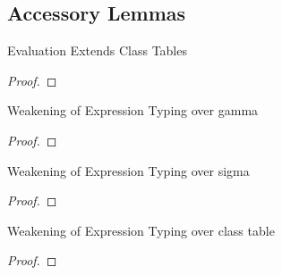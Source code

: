 \documentclass[acmlarge, anonymous, authordraft, review]{acmart} %
\begin{document}
\subsection*{Accessory Lemmas}

\begin{lemma}{Evaluation Extends Class Tables}{}
  \begin{conds}
    \cond{$\Reduce \K\e\s \Kp\ep\sp$}
  \end{conds}

  \then{}

  \begin{proof} \innat
  \end{proof}
\end{lemma}

\begin{lemma}{Weakening of Expression Typing over gamma}{}
  \begin{conds}
    \cond{$\EnvType\Env\s\K\e\t$}
  \end{conds}

  \then\axiom{$\EnvType{\Env~\Envp}\s\K\e\t$}

  \begin{proof} 
  \end{proof}
\end{lemma}

\begin{lemma}{Weakening of Expression Typing over sigma}{}
  \begin{conds}
    \cond{$\EnvType\Env\s\K\e\t$}
  \end{conds}

  \then{}

  \begin{proof} 
  \end{proof}
\end{lemma}

\begin{lemma}{Weakening of Expression Typing over class table}{}
  \begin{conds}
    \cond{$\EnvType\Env\s\K\e\t$}
  \end{conds}

  \then\axiom{$\EnvType\Env\s{\K~\Kp}\e\t$}

  \begin{proof} 
  \end{proof}
\end{lemma}
\end{document}
